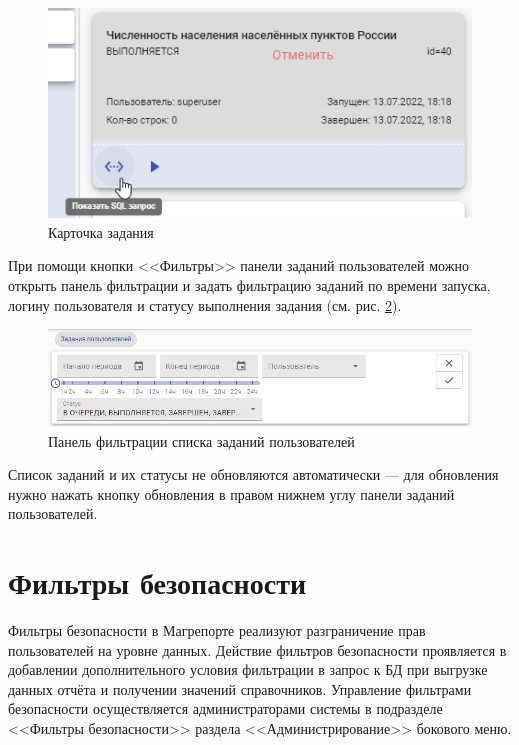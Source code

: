 \documentclass[../user-manual.tex]{subfiles}
\begin{document}
	
	\begin{figure}[h]
		\centering
		\includegraphics[width=\graphicswidth]{img/09-user-job-card.png}
		\caption{Карточка задания}
		\label{fig:user-job-card}
	\end{figure}

	При помощи кнопки <<Фильтры>> панели заданий пользователей можно открыть панель фильтрации и задать фильтрацию заданий по времени запуска, логину пользователя и статусу выполнения задания (см. рис. \ref{fig:user-job-filter}).
	
	\begin{figure}[h]
		\centering
		\includegraphics[width=\graphicswidth]{img/10-user-job-filter.png}
		\caption{Панель фильтрации списка заданий пользователей}
		\label{fig:user-job-filter}
	\end{figure}	

	Список заданий и их статусы не обновляются автоматически --- для обновления нужно нажать кнопку обновления в правом нижнем углу панели заданий пользователей.

	\section{Фильтры безопасности}\label{administration:security-filters}
	
	Фильтры безопасности в Магрепорте реализуют разграничение прав пользователей на уровне данных. Действие фильтров безопасности проявляется в добавлении дополнительного условия фильтрации в запрос к БД при выгрузке данных отчёта и получении значений справочников. Управление фильтрами безопасности осуществляется администраторами системы в подразделе <<Фильтры безопасности>> раздела <<Администрирование>> бокового меню.
	
\end{document}
